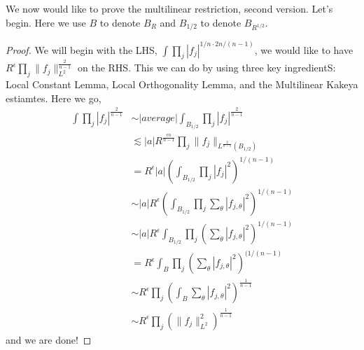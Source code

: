 We now would like to prove the multilinear restriction, second version. Let's begin. Here we use $B$ to denote $B_R$ and $B_{1/2}$ to denote $B_{R^{1/2}}$.
\begin{proof}
    We will begin with the LHS, $\int\prod_j|f_j|^{1/n\cdot2n/(n-1)}$, we would like to have $R^\epsilon\prod_j\|f_j\|_{L^2}^{\frac{2}{n-1}}$ on the RHS.
    This we can do by using three key ingredientS: Local Constant Lemma, Local Orthogonality Lemma, and the Multilinear Kakeya estiamtes. Here we go,
    \begin{align*}
        \int\prod_j|f_j|^{\frac{2}{n-1}}&\sim |average|\int_{B_{1/2}}\prod_j|f_j|^{\frac{2}{n-1}}\\
        &\lesssim |a|R^{\frac{\epsilon n}{n-1}}\prod_j\|f_j\|_{L^\frac{2}{n-1}(B_{1/2})}\\
        &=R^\epsilon |a|\left(\int_{B_{1/2}}\prod_j|f_j|^2\right)^{1/(n-1)}\\
        &\sim |a|R^\epsilon\left(\int_{B_{1/2}}\prod_j\sum_\theta|f_{j,\theta}|^2\right)^{1/(n-1)}\\
        &\sim |a|R^\epsilon\int_{B_{1/2}}\prod_j\left(\sum_\theta|f_{j,\theta}|^2\right)^{1/(n-1)}\\
        &=R^\epsilon\int_B\prod_j\left(\sum_\theta|f_{j,\theta}|^2\right)^{(1/(n-1)}\\
        &\sim R^\epsilon\prod_j\left(\int_B\sum_\theta|f_{j,\theta}|^2\right)^{\frac{1}{n-1}}\\
        &\sim R^\epsilon\prod_j\left(\|f_j\|_{L^2}^2 \right)^{\frac{1}{n-1}}
    \end{align*}
    and we are done!
\end{proof}

